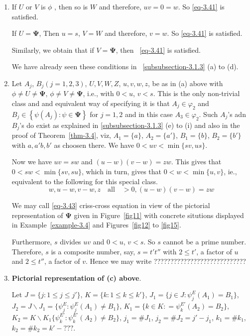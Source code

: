 \documentclass[a4paper,12pt]{article}
\theoremstyle{definition}
\theoremstyle{underlinethm}
\theoremstyle{definition}
\begin{document}
\begin{enumerate}[label=(\alph*)]
\item  If $U$ or $V$ is $\phi$ , then so is $W$ and therefore, $uv=0 =w$. So \eqref{eq-3.41} is satisfied.

If $U = \boldsymbol{\Psi}$, Then $u=s$, $V=W$ and therefore, $v=w$. So \eqref{eq-3.41} is satisfied.

Similarly, we obtain that if $V = \boldsymbol{\Psi}$, then ~\eqref{eq-3.41} is satisfied.

We have already seen these conditions in ~\ref{subsubsection-3.1.3} (a) to (d).

\item Let $A_{j}$, $B_{j} (j=1,2,3)$, $U,V,W,Z$, $u,v,w,z$, be as in (a) above with $\phi \neq U \neq \boldsymbol{\Psi}$, $\phi \neq V \neq \boldsymbol{\Psi}$, i.e., with $0 < u$, $v < s$. This is the only non-trivial class and and equivalent way of specifying it is that $A_{j} \in \varphi_{2}$ and $B_{j} \in \left\{\psi(A_{j}) : \psi \in \boldsymbol{\Psi}\right\}$ for $j=1,2$ and in this case $A_{3} \in \varphi_{2}$. Such $A_{j}$'s adn $B_{j}$'s do exist as explained in \eqref{subsubsection-3.1.3} (e) to (i) and also in the proof of Theorem~\ref{thm-3.4}, viz, $A_{1} = \{a\}$, $A_{2} = \{a'\}$, $B_{1} = \{b\}$, $B_{2} = \{b'\}$ with $a, a' b, b'$ as choosen there. We have $0< uv < \min \{sv, us\}$. 

Now we have $uv=sw$ and $(u-w)(v-w) =zw$. This gives that $0< sw < \min \{sv, su\}$, which in turn, gives that $0 < w < \min\{ u,v\}$, ie., equivalent to the following for this special class.
\begin{equation}
w, u-w, v-w, z\quad \text{all}\quad  > 0, (u-w)(v-w) =zw \tag{3.43}\label{eq-3.43}
\end{equation} 

We may call \eqref{eq-3.43} criss-cross equation in view of the pictorial representation of $\boldsymbol{\Psi}$ given in Figure~\ref{fig11} with concrete situtions displayed in Example~\ref{example-3.4} and Figures~\ref{fig12} to \ref{fig15}.

Furthermore, $s$ divides $uv$ and $0 < u$, $v < s$. So $s$ cannot be a prime number. Therefore, $s$ is a composite number, say, $s = t' t''$ with $2 \leq t'$, a factor of $u$ and $2 \leq t''$, a factor of $v$. Hence we may write ????????????????????????????


\item \textbf{Pictorial representation of (c) above}. 

Let $J = \{j : 1 \leq j \leq j' \}$, $K = \{k : 1 \leq k \leq k'\}$, $J_{1} = \{j \in  J : \psi_{j}^{E} (A_{1}) = B_{1}\}$, $J_{2} = J \smallsetminus J_{1} = \{ \psi_{j}^{E} : \psi_{j}^{E}(A_{1}) \neq B_{1}\}$, $K_{1} = \{k \in K : =\psi_{k}^{E'} (A_{2}) = B_{2}\}$, $K_{2} = K \smallsetminus K_{1}\{\psi_{k}^{E'} : \psi_{k}^{E'}(A_{2}) \neq B_{2}\}$, $j_{1} = \# J_{1}$, $j_{2} = \# J_{2} = j'-j_{1}$, $k_{1} = \# k_{1}$, $k_{2}= \# k_{2} = k' - ???$.


\end{enumerate}
\end{document}
